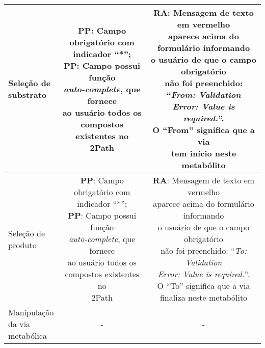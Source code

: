 \begin{table}
\begin{tabular}{|l|c|c|}
\specialcell{Seleção de\\substrato} & \specialcell{\textbf{PP}: Campo obrigatório com\\indicador ``*'';\\\textbf{PP}: Campo possui função\\\textit{auto-complete}, que fornece\\ao usuário todos os\\compostos existentes no\\2Path} & \specialcell{\textbf{RA}: Mensagem de texto em vermelho \\aparece acima do formulário informando\\o usuário de que o campo obrigatório\\não foi preenchido: ``\textit{From: Validation}\\\textit{Error: Value is required.}''.\\O ``From'' significa que a via\\tem início neste metabólito} \\ \hline

\specialcell{Seleção de\\produto} & \specialcell{\textbf{PP}: Campo obrigatório com\\indicador ``*'';\\\textbf{PP}: Campo possui função\\\textit{auto-complete}, que fornece\\ao usuário todos os\\compostos existentes no\\2Path} & \specialcell{\textbf{RA}: Mensagem de texto em vermelho \\aparece acima do formulário informando\\o usuário de que o campo obrigatório\\não foi preenchido: ``\textit{To: Validation}\\\textit{Error: Value is required.}''.\\O ``To'' significa que a via\\finaliza neste metabólito} \\ \hline

\specialcell{Manipulação\\da via\\metabólica} & - & - \\ \hline
\end{tabular}
\end{table}


